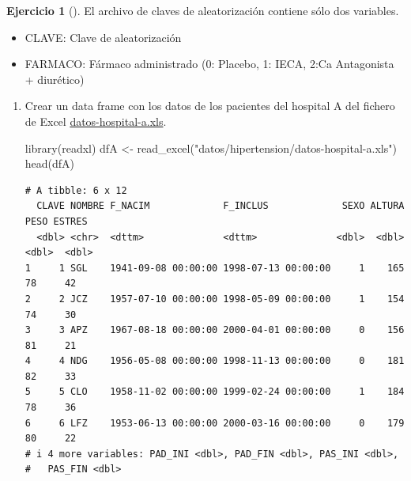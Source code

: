 \documentclass[
  spanish,
  a4paper,
]{scrreport}
\newenvironment{Shaded}{\begin{snugshade}}{\end{snugshade}}
\newcommand{\FunctionTok}[1]{\textcolor[rgb]{0.28,0.35,0.67}{#1}}
\newcommand{\NormalTok}[1]{\textcolor[rgb]{0.00,0.23,0.31}{#1}}
\newcommand{\OtherTok}[1]{\textcolor[rgb]{0.00,0.23,0.31}{#1}}
\newcommand{\StringTok}[1]{\textcolor[rgb]{0.13,0.47,0.30}{#1}}
\providecommand{\tightlist}{%
  \setlength{\itemsep}{0pt}\setlength{\parskip}{0pt}}
\theoremstyle{definition}
\newtheorem{exercise}{Ejercicio}[chapter]
\theoremstyle{remark}
\begin{document}
\begin{exercise}[]
El archivo de claves de aleatorización contiene sólo dos variables.

\begin{itemize}
\tightlist
\item
  CLAVE: Clave de aleatorización
\item
  FARMACO: Fármaco administrado (0: Placebo, 1: IECA, 2:Ca Antagonista +
  diurético)
\end{itemize}

\begin{enumerate}
\def\labelenumi{\alph{enumi}.}
\item
  Crear un data frame con los datos de los pacientes del hospital A del
  fichero de Excel
  \href{datos/hipertension/datos-hospital-a.xls}{datos-hospital-a.xls}.

  \begin{tcolorbox}[enhanced jigsaw, titlerule=0mm, arc=.35mm, rightrule=.15mm, opacitybacktitle=0.6, leftrule=.75mm, colframe=quarto-callout-tip-color-frame, toptitle=1mm, breakable, colbacktitle=quarto-callout-tip-color!10!white, bottomrule=.15mm, colback=white, left=2mm, bottomtitle=1mm, opacityback=0, title=\textcolor{quarto-callout-tip-color}{\faLightbulb}\hspace{0.5em}{Solución}, toprule=.15mm, coltitle=black]

\begin{Shaded}
\begin{Highlighting}[]
\FunctionTok{library}\NormalTok{(readxl)}
\NormalTok{dfA }\OtherTok{\textless{}{-}} \FunctionTok{read\_excel}\NormalTok{(}\StringTok{"datos/hipertension/datos{-}hospital{-}a.xls"}\NormalTok{)}
\FunctionTok{head}\NormalTok{(dfA)}
\end{Highlighting}
\end{Shaded}

\begin{verbatim}
# A tibble: 6 x 12
  CLAVE NOMBRE F_NACIM             F_INCLUS             SEXO ALTURA  PESO ESTRES
  <dbl> <chr>  <dttm>              <dttm>              <dbl>  <dbl> <dbl>  <dbl>
1     1 SGL    1941-09-08 00:00:00 1998-07-13 00:00:00     1    165    78     42
2     2 JCZ    1957-07-10 00:00:00 1998-05-09 00:00:00     1    154    74     30
3     3 APZ    1967-08-18 00:00:00 2000-04-01 00:00:00     0    156    81     21
4     4 NDG    1956-05-08 00:00:00 1998-11-13 00:00:00     0    181    82     33
5     5 CLO    1958-11-02 00:00:00 1999-02-24 00:00:00     1    184    78     36
6     6 LFZ    1953-06-13 00:00:00 2000-03-16 00:00:00     0    179    80     22
# i 4 more variables: PAD_INI <dbl>, PAD_FIN <dbl>, PAS_INI <dbl>,
#   PAS_FIN <dbl>
\end{verbatim}


\end{tcolorbox}
\end{enumerate}
\end{exercise}
\end{document}
